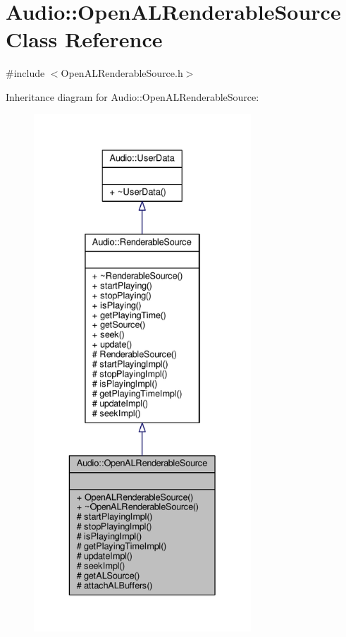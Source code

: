 \hypertarget{classAudio_1_1OpenALRenderableSource}{}\section{Audio\+:\+:Open\+A\+L\+Renderable\+Source Class Reference}
\label{classAudio_1_1OpenALRenderableSource}


{\ttfamily \#include $<$Open\+A\+L\+Renderable\+Source.\+h$>$}



Inheritance diagram for Audio\+:\+:Open\+A\+L\+Renderable\+Source\+:
\nopagebreak
\begin{figure}[H]
\begin{center}
\leavevmode
\includegraphics[height=550pt]{dd/dc1/classAudio_1_1OpenALRenderableSource__inherit__graph}
\end{center}
\end{figure}


